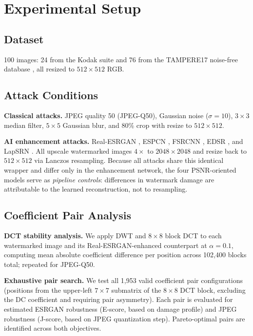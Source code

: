 \documentclass[conference]{IEEEtran}
\begin{document}
\section{Experimental Setup}
\label{sec:setup}

\subsection{Dataset}
100 images: 24 from the Kodak suite \cite{kodak} and 76 from the
TAMPERE17 noise-free database \cite{tampere17}, all resized to
$512\times512$ RGB.

\subsection{Attack Conditions}
\textbf{Classical attacks.} JPEG quality 50 (JPEG-Q50), Gaussian noise
($\sigma=10$), $3\times3$ median filter, $5\times5$ Gaussian blur, and
80\% crop with resize to $512\times512$.

\textbf{AI enhancement attacks.} Real-ESRGAN \cite{realesrgan2021},
ESPCN \cite{espcn2016}, FSRCNN \cite{fsrcnn2016}, EDSR
\cite{edsr2017}, and LapSRN \cite{lapsrn2017}. All upscale watermarked images $4\times$ to
$2048\times2048$ and resize back to $512\times512$ via Lanczos
resampling. Because all attacks share this identical wrapper and differ
only in the enhancement network, the four PSNR-oriented models serve as
\emph{pipeline controls}: differences in watermark damage are
attributable to the learned reconstruction, not to resampling.

\subsection{Coefficient Pair Analysis}
\textbf{DCT stability analysis.} We apply DWT and $8\times8$ block DCT
to each watermarked image and its Real-ESRGAN-enhanced counterpart at
$\alpha=0.1$, computing mean absolute coefficient difference per position
across 102,400 blocks total; repeated for JPEG-Q50.

\textbf{Exhaustive pair search.} We test all 1,953 valid coefficient
pair configurations (positions from the upper-left $7\times7$ submatrix
of the $8\times8$ DCT block, excluding the DC coefficient and requiring
pair asymmetry). Each pair is evaluated for estimated ESRGAN robustness
(E-score, based on damage profile) and JPEG robustness (J-score, based
on JPEG quantization step). Pareto-optimal pairs are identified across
both objectives.
\end{document}
